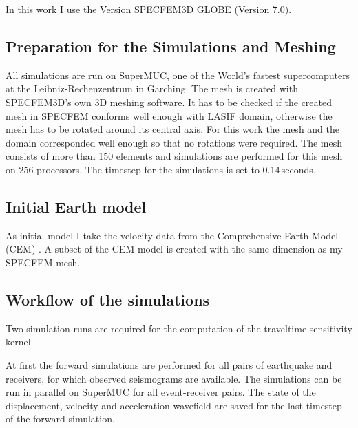 In this work I use the Version SPECFEM3D GLOBE (Version 7.0). 


\subsection{Preparation for the Simulations and Meshing}

All simulations are run on SuperMUC, one of the World's fastest supercomputers at the Leibniz-Rechenzentrum in Garching. 
The mesh is created with SPECFEM3D's own 3D meshing software. 
It has to be checked if the created mesh in SPECFEM conforms well enough with LASIF domain, otherwise the mesh has to 
be rotated around its central axis.
For this work the mesh and the domain corresponded well enough so that no rotations were required.
The mesh consists of more than 150 %
elements and simulations are performed for this mesh on 256 processors.
The timestep for the simulations is set to 0.14$\,$seconds.  


\subsection{Initial Earth model}

As initial model I take the velocity data from the Comprehensive Earth Model (CEM) \citep{Afanasiev2014}.
A subset of the CEM model is created with the same dimension as my SPECFEM mesh. 


\subsection{Workflow of the simulations}

Two simulation runs are required for the computation of the traveltime sensitivity kernel.

At first the forward simulations are performed for all pairs of earthquake and receivers, for which observed seismograms are available.
The simulations can be run in parallel on SuperMUC for all event-receiver pairs.
The state of the displacement, velocity and acceleration wavefield are saved for the last timestep of the forward simulation.

